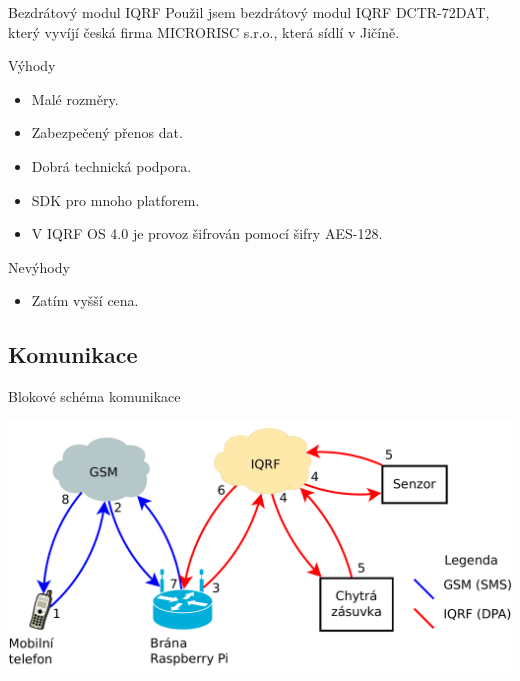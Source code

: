 \documentclass[11pt]{beamer}
\begin{document}
\begin{frame}{Bezdrátový modul IQRF}
  Použil jsem bezdrátový modul IQRF DCTR-72DAT, který vyvíjí česká firma MICRORISC s.r.o., která sídlí v Jičíně.
  \begin{exampleblock}{Výhody}
    \begin{itemize}
      \item Malé rozměry.
      \item Zabezpečený přenos dat.
      \item Dobrá technická podpora.
      \item SDK pro mnoho platforem.
      \item V IQRF OS 4.0 je provoz šifrován pomocí šifry AES-128.
    \end{itemize}
  \end{exampleblock}
  \begin{alertblock}{Nevýhody}
    \begin{itemize}
      \item Zatím vyšší cena.
    \end{itemize}
  \end{alertblock}
\end{frame}

\subsection{Komunikace}

\begin{frame}{Blokové schéma komunikace}
  \begin{center}
    \includegraphics[width = \textwidth]{../img/blokove-schema/komunikace.pdf}
  \end{center}
\end{frame}
\end{document}
